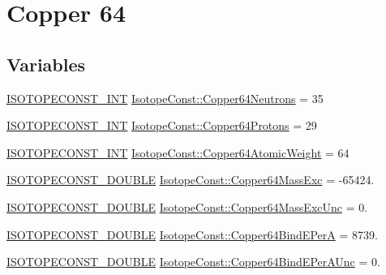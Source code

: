 \hypertarget{group___isotope_const-_copper-_cu64}{}\section{Copper 64}
\label{group___isotope_const-_copper-_cu64}
\subsection*{Variables}
\begin{DoxyCompactItemize}
\item 
\mbox{\hyperlink{group___isotope_const-_macros_ga5f18360b3e99483a35c32d789e62621c}{I\+S\+O\+T\+O\+P\+E\+C\+O\+N\+S\+T\+\_\+\+I\+NT}} \mbox{\hyperlink{group___isotope_const-_copper-_cu64_gaff84b63abe19e24a82d03a8787cec6cd}{Isotope\+Const\+::\+Copper64\+Neutrons}} = 35
\item 
\mbox{\hyperlink{group___isotope_const-_macros_ga5f18360b3e99483a35c32d789e62621c}{I\+S\+O\+T\+O\+P\+E\+C\+O\+N\+S\+T\+\_\+\+I\+NT}} \mbox{\hyperlink{group___isotope_const-_copper-_cu64_ga5b40061409466169d763f1311e7351ea}{Isotope\+Const\+::\+Copper64\+Protons}} = 29
\item 
\mbox{\hyperlink{group___isotope_const-_macros_ga5f18360b3e99483a35c32d789e62621c}{I\+S\+O\+T\+O\+P\+E\+C\+O\+N\+S\+T\+\_\+\+I\+NT}} \mbox{\hyperlink{group___isotope_const-_copper-_cu64_gad78c803a936311b5e93128ca72bfd7ac}{Isotope\+Const\+::\+Copper64\+Atomic\+Weight}} = 64
\item 
\mbox{\hyperlink{group___isotope_const-_macros_ga8f45a7272ce02c0b4c65c44636ed719a}{I\+S\+O\+T\+O\+P\+E\+C\+O\+N\+S\+T\+\_\+\+D\+O\+U\+B\+LE}} \mbox{\hyperlink{group___isotope_const-_copper-_cu64_ga9ee041a338946489acb8f69bd355cbc9}{Isotope\+Const\+::\+Copper64\+Mass\+Exc}} = -\/65424.
\item 
\mbox{\hyperlink{group___isotope_const-_macros_ga8f45a7272ce02c0b4c65c44636ed719a}{I\+S\+O\+T\+O\+P\+E\+C\+O\+N\+S\+T\+\_\+\+D\+O\+U\+B\+LE}} \mbox{\hyperlink{group___isotope_const-_copper-_cu64_ga60e970cec0b296bf4f44197c49bff6b7}{Isotope\+Const\+::\+Copper64\+Mass\+Exc\+Unc}} = 0.
\item 
\mbox{\hyperlink{group___isotope_const-_macros_ga8f45a7272ce02c0b4c65c44636ed719a}{I\+S\+O\+T\+O\+P\+E\+C\+O\+N\+S\+T\+\_\+\+D\+O\+U\+B\+LE}} \mbox{\hyperlink{group___isotope_const-_copper-_cu64_ga98129cdccc6358e7d085760c16bcac29}{Isotope\+Const\+::\+Copper64\+Bind\+E\+PerA}} = 8739.
\item 
\mbox{\hyperlink{group___isotope_const-_macros_ga8f45a7272ce02c0b4c65c44636ed719a}{I\+S\+O\+T\+O\+P\+E\+C\+O\+N\+S\+T\+\_\+\+D\+O\+U\+B\+LE}} \mbox{\hyperlink{group___isotope_const-_copper-_cu64_ga383ba55759e69920359685f66f89498a}{Isotope\+Const\+::\+Copper64\+Bind\+E\+Per\+A\+Unc}} = 0.

\end{DoxyCompactItemize}

